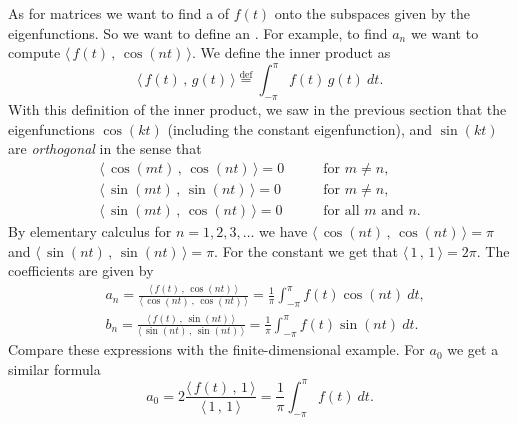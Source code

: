 \documentclass[12pt]{book}
\begin{document}
As for matrices we want to find a \emph{}
of $f(t)$ onto the subspaces given by the eigenfunctions.  So we want to
define an \emph{}.  For example, to
find $a_n$ we want to compute $\langle \, f(t) \, , \, \cos (nt) \, \rangle$.
We define the inner product as
\begin{equation*}
\langle \, f(t)\, , \, g(t) \, \rangle \overset{\text{def}}{=}
\int_{-\pi}^\pi f(t) \, g(t) ~ dt .
\end{equation*}
With this definition of the inner product,
we saw in the previous section that the eigenfunctions $\cos (kt)$
(including the constant eigenfunction), and
$\sin (kt)$ are \emph{orthogonal} in the sense
that
\begin{align*}
\langle \, \cos (mt)\, , \, \cos (nt) \, \rangle = 0 & \qquad \text{for } m \not= n , \\
\langle \, \sin (mt)\, , \, \sin (nt) \, \rangle = 0 & \qquad \text{for } m \not= n , \\
\langle \, \sin (mt)\, , \, \cos (nt) \, \rangle = 0 & \qquad \text{for all } m \text{ and } n .
\end{align*}
By elementary calculus for $n=1,2,3,\ldots$
we have $\langle \, \cos (nt) \, , \, \cos (nt) \, \rangle = \pi$
and $\langle \, \sin (nt) \, , \, \sin (nt) \, \rangle = \pi$.  For the constant we get
that $\langle \, 1 \, , \, 1 \, \rangle = 2\pi$.
The coefficients are given by
\begin{equation*}
\boxed{~~
\begin{aligned}
& a_n =
\frac{\langle \, f(t) \, , \, \cos (nt) \, \rangle}{\langle \, \cos (nt) \, , \,
\cos (nt) \, \rangle}
= 
\frac{1}{\pi} \int_{-\pi}^\pi f(t) \cos (nt) ~ dt , \\
& b_n =
\frac{\langle \, f(t) \, , \, \sin (nt) \, \rangle}{\langle \, \sin (nt) \, , \,
\sin (nt) \, \rangle}
= 
\frac{1}{\pi} \int_{-\pi}^\pi f(t) \sin (nt) ~ dt .
\end{aligned}
~~}
\end{equation*}
Compare these expressions with the finite-dimensional example.
For $a_0$ we get a similar formula
\begin{equation*}
\boxed{~~
a_0 = 2
\frac{\langle \, f(t) \, , \, 1 \, \rangle}{\langle \, 1 \, , \,
1 \, \rangle}
=
\frac{1}{\pi} \int_{-\pi}^\pi f(t) ~ dt .
~~}
\end{equation*}
\end{document}
